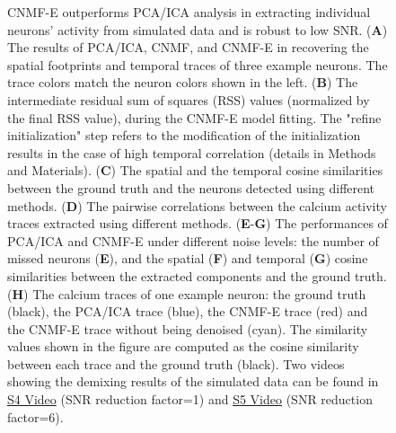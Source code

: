 \documentclass[9pt,lineno]{elife}
\begin{document}
\begin{figure}[!t]
  \caption{CNMF-E outperforms PCA/ICA analysis in extracting individual neurons' activity from simulated data and is robust to low SNR. (\textbf{A}) The results of PCA/ICA, CNMF, and CNMF-E in recovering the spatial footprints and temporal traces of three example neurons. The trace colors match the neuron colors shown in the left. (\textbf{B}) The intermediate residual sum of squares (RSS) values (normalized by the final RSS value), during the CNMF-E model fitting. The "refine initialization" step refers to the modification of the initialization results in the case of high temporal correlation (details in Methods and Materials).  (\textbf{C}) The spatial and the temporal cosine similarities between the ground truth and the neurons detected using different methods. (\textbf{D}) The pairwise correlations between the calcium activity traces extracted using different methods.  (\textbf{E}-\textbf{G}) The performances of PCA/ICA and CNMF-E under different noise levels: the number of missed neurons (\textbf{E}), and the spatial (\textbf{F})  and temporal (\textbf{G}) cosine similarities between the extracted components and the ground truth. (\textbf{H}) The calcium traces of one example neuron: the ground truth (black), the PCA/ICA trace (blue), the CNMF-E trace (red) and the CNMF-E trace without being denoised (cyan). The similarity values shown in the figure are computed as the cosine similarity between each trace and the ground truth (black). Two videos showing the demixing results of the simulated  data can be found in  \href{http://www.columbia.edu/~pz2230/videos/sim_snr1_demixing.mp4}{S4 Video}  (SNR reduction factor=1)  and  \href{http://www.columbia.edu/~pz2230/videos/sim_snr6_demixing.mp4}{S5 Video} (SNR reduction factor=6).}
  \label{fig:sim_compare}
\end{figure}
\end{document}
